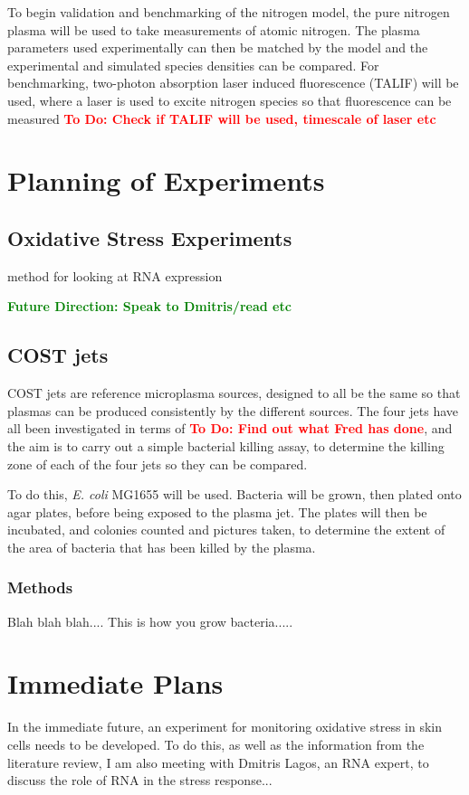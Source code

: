 \documentclass[11pt, oneside]{article}   	%
\newcommand{\todo}[1]{ \textcolor{red}{\bf{To Do:} #1}}
\newcommand{\future}[1]{ \textcolor{green}{\bf{Future Direction: #1}}}
\begin{document}
To begin validation and benchmarking of the nitrogen model, the pure nitrogen plasma will be used to take measurements of atomic nitrogen. 
The plasma parameters used experimentally can then be matched by the model and the experimental and simulated species densities can be compared.
For benchmarking, two-photon absorption laser induced fluorescence (TALIF) will be used, where a laser is used to excite nitrogen species so that fluorescence can be measured \todo{Check if TALIF will be used, timescale of laser etc}


\section{Planning of Experiments}
\subsection{Oxidative Stress Experiments}
method for looking at RNA expression

\future{Speak to Dmitris/read etc}

\subsection{COST jets}

COST jets are reference microplasma sources, designed to all be the same so that plasmas can be produced consistently by the different sources.
The four jets have all been investigated in terms of \todo{Find out what Fred has done}, and the aim is to carry out a simple bacterial killing assay, to determine the killing zone of each of the four jets so they can be compared. 

To do this, \textit{E. coli} MG1655 will be used. 
Bacteria will be grown, then plated onto agar plates, before being exposed to the plasma jet. 
The plates will then be incubated, and colonies counted and pictures taken, to determine the extent of the area of bacteria that has been killed by the plasma.

\subsubsection{Methods}
Blah blah blah.... This is how you grow bacteria.....

\section{Immediate Plans}
In the immediate future, an experiment for monitoring oxidative stress in skin cells needs to be developed. 
To do this, as well as the information from the literature review, I am also meeting with Dmitris Lagos, an RNA expert, to discuss the role of RNA in the stress response...
\end{document}
